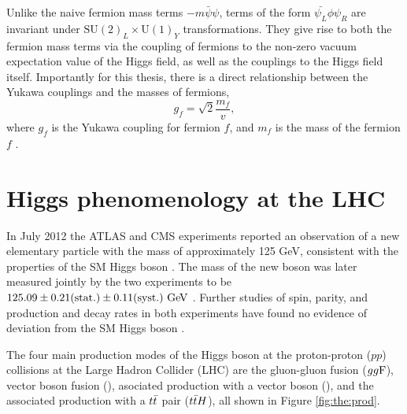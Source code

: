Unlike the naive fermion mass terms $-m \bar{\psi}\psi$, terms of the form $\bar{\psi_L}\phi\psi_R$ 
are invariant under $\text{SU}(2)_L \times \text{U}(1)_Y$ transformations. They give rise to both the fermion mass terms
via the coupling of fermions to the non-zero vacuum expectation value of the Higgs field,
as well as the couplings to the Higgs field itself. Importantly for this thesis, there is 
a direct relationship between the Yukawa couplings and the
masses of fermions,
\begin{equation}
g_f = \sqrt{2}\frac{m_f}{v},
\end{equation}
where $g_f$ is the Yukawa coupling for fermion $f$, and $m_f$ is the mass of the fermion $f$ 
\cite{Thomson:2013zua}.

\section{Higgs phenomenology at the LHC}

In July 2012 the ATLAS and CMS experiments reported an observation of a new elementary particle with the
mass of approximately 125 GeV, consistent with the properties of the SM Higgs boson
\cite{Aad:2012tfa, Chatrchyan:2012xdj}. The mass of the new boson was later measured
jointly by the two experiments to be $125.09 \pm 0.21 (\text{stat.}) \pm 0.11 (\text{syst.})~\text{Ge\kern -0.1em V}$
\cite{Aad:2015zhl}. Further studies of spin, parity, and production
and decay rates in both experiments have found no evidence of deviation from the SM
Higgs boson \cite{Aad:2015mxa, PhysRevD.92.012004, Khachatryan:2016vau, Aad:2019mbh}.

The four main production modes of the Higgs boson at the proton-proton ($pp$) collisions
at the Large Hadron Collider (LHC) are the gluon-gluon fusion ($gg\text{F}$), vector boson fusion
(\vbf), asociated production with a vector boson (\vh), and the associated production with
a $t\bar{t}$ pair ($t\bar{t} H$), all shown in Figure \ref{fig:the:prod}.

